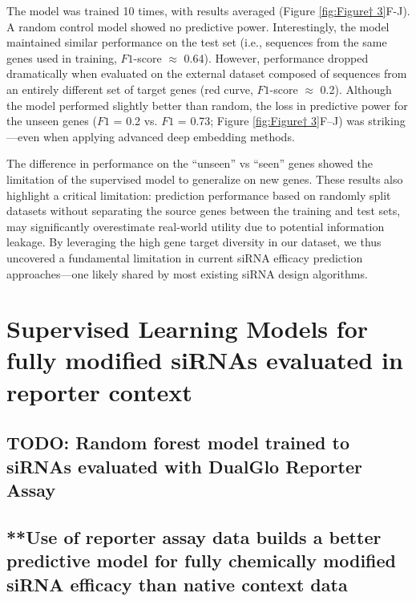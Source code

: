 \documentclass{report}
\begin{document}
The model was trained 10 times, with results averaged (Figure \ref{fig:Figure† 3}F-J). A random control model showed no predictive power. Interestingly, the model maintained similar performance on the test set (i.e., sequences from the same genes used in training, $F1$-score $\approx$ 0.64). However, performance dropped dramatically when evaluated on the external dataset composed of sequences from an entirely different set of target genes (red curve, $F1$-score $\approx$ 0.2). Although the model performed slightly better than random, the loss in predictive power for the unseen genes ($F1$ = 0.2 vs. $F1$ = 0.73; Figure \ref{fig:Figure† 3}F–J) was striking—even when applying advanced deep embedding methods. 

The difference in performance on the “unseen” vs “seen” genes showed the limitation of the supervised model to generalize on new genes. These results also highlight a critical limitation: prediction performance based on randomly split datasets without separating the source genes between the training and test sets, may significantly overestimate real-world utility due to potential information leakage. By leveraging the high gene target diversity in our dataset, we thus uncovered a fundamental limitation in current siRNA efficacy prediction approaches—one likely shared by most existing siRNA design algorithms.




\section{Supervised Learning Models for fully modified siRNAs evaluated in reporter context}

\subsection{TODO: Random forest model trained to siRNAs evaluated with DualGlo Reporter Assay}

\subsection{**Use of reporter assay data builds a better predictive model for fully chemically modified siRNA efficacy than native context data}
\end{document}
